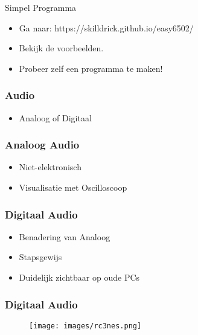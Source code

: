 \documentclass[aspectratio=43]{uva-inf-presentation}
\begin{document}

\begin{frame}{Simpel Programma}

\begin{itemize}
\item Ga naar: https://skilldrick.github.io/easy6502/
\item Bekijk de voorbeelden.
\item Probeer zelf een programma te maken!
\end{itemize}


\end{frame}


\begin{frame}
\frametitle{Audio}

\begin{itemize}
\item Analoog of Digitaal
\end{itemize}

\end{frame}


\begin{frame}
\frametitle{Analoog Audio}

\begin{itemize}
\item Niet-elektronisch
\item Visualisatie met Oscilloscoop
\end{itemize}

\end{frame}


\begin{frame}
\frametitle{Digitaal Audio}

\begin{itemize}
\item Benadering van Analoog
\item Stapsgewijs
\item Duidelijk zichtbaar op oude PCs
\end{itemize}

\end{frame}


\begin{frame}
\frametitle{Digitaal Audio}

\begin{figure}
\texttt{[image: images/rc3nes.png]}
\end{figure}

\end{frame}
\end{document}
